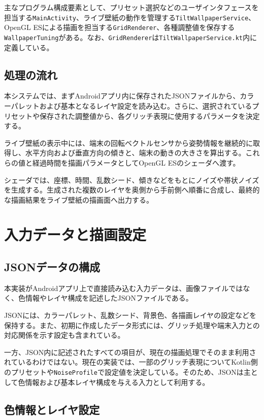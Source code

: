 主なプログラム構成要素として、プリセット選択などのユーザインタフェースを担当する\texttt{MainActivity}、ライブ壁紙の動作を管理する\texttt{TiltWallpaperService}、OpenGL ESによる描画を担当する\texttt{GridRenderer}、各種調整値を保存する\texttt{WallpaperTuning}がある。なお、\texttt{GridRenderer}は\texttt{TiltWallpaperService.kt}内に定義している。


\subsection{処理の流れ}

本システムでは、まずAndroidアプリ内に保存されたJSONファイルから、カラーパレットおよび基本となるレイヤ設定を読み込む。さらに、選択されているプリセットや保存された調整値から、各グリッチ表現に使用するパラメータを決定する。

ライブ壁紙の表示中には、端末の回転ベクトルセンサから姿勢情報を継続的に取得し、水平方向および垂直方向の傾きと、端末の動きの大きさを算出する。これらの値と経過時間を描画パラメータとしてOpenGL ESのシェーダへ渡す。

シェーダでは、座標、時間、乱数シード、傾きなどをもとにノイズや帯状ノイズを生成する。生成された複数のレイヤを奥側から手前側へ順番に合成し、最終的な描画結果をライブ壁紙の描画面へ出力する。


\section{入力データと描画設定}

\subsection{JSONデータの構成}

本実装がAndroidアプリ上で直接読み込む入力データは、画像ファイルではなく、色情報やレイヤ構成を記述したJSONファイルである。

JSONには、カラーパレット、乱数シード、背景色、各描画レイヤの設定などを保持する。また、初期に作成したデータ形式には、グリッチ処理や端末入力との対応関係を示す設定も含まれている。

一方、JSON内に記述されたすべての項目が、現在の描画処理でそのまま利用されているわけではない。現在の実装では、一部のグリッチ表現についてKotlin側のプリセットや\texttt{NoiseProfile}で設定値を決定している。そのため、JSONは主として色情報および基本レイヤ構成を与える入力として利用する。


\subsection{色情報とレイヤ設定}

